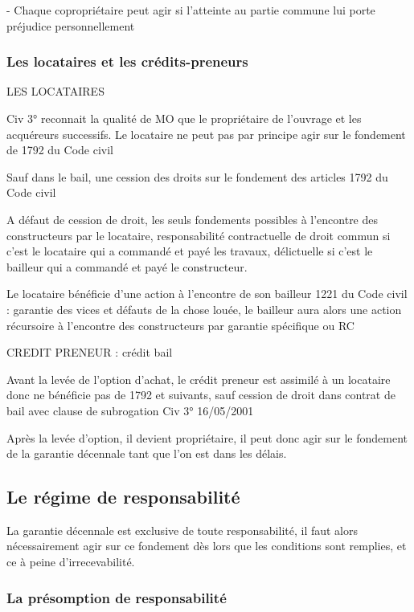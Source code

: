 		-	Chaque copropriétaire peut agir si l’atteinte au partie commune lui porte préjudice personnellement


		\subsubsection{Les locataires et les crédits-preneurs}

		LES LOCATAIRES

		Civ 3° reconnait la qualité de MO que le propriétaire de l’ouvrage et les acquéreurs successifs.
		Le locataire ne peut pas par principe agir sur le fondement de 1792 du Code civil

		Sauf dans le bail, une cession des droits sur le fondement des articles 1792 du Code civil

		A défaut de cession de droit, les seuls fondements possibles à l’encontre des constructeurs par le locataire, responsabilité contractuelle de droit commun si c’est le locataire qui a commandé et payé les travaux, délictuelle si c’est le bailleur qui a commandé et payé le constructeur.

		Le locataire bénéficie d’une action à l’encontre de son bailleur 1221 du Code civil : garantie des vices et défauts de la chose louée, le bailleur aura alors une action récursoire à l’encontre des constructeurs par garantie spécifique ou RC

		CREDIT PRENEUR : crédit bail

		Avant la levée de l’option d’achat, le crédit preneur est assimilé à un locataire donc ne bénéficie pas de 1792 et suivants, sauf cession de droit dans contrat de bail avec clause de subrogation Civ 3° 16/05/2001

		Après la levée d’option, il devient propriétaire, il peut donc agir sur le fondement de la garantie décennale tant que l’on est dans les délais.


	\subsection{Le régime de responsabilité}

	La garantie décennale est exclusive de toute responsabilité, il faut alors nécessairement agir sur ce fondement dès lors que les conditions sont remplies, et ce à peine d’irrecevabilité.

		\subsubsection{La présomption de responsabilité}

